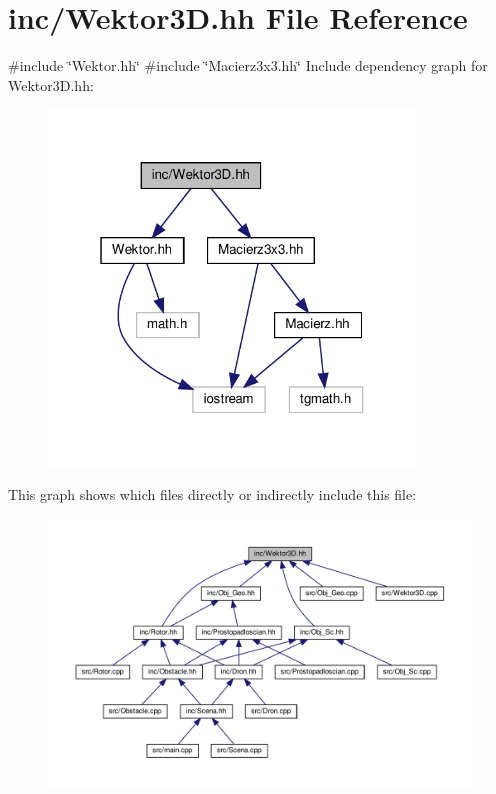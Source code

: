 \hypertarget{_wektor3_d_8hh}{}\section{inc/\+Wektor3D.hh File Reference}
\label{_wektor3_d_8hh}
{\ttfamily \#include \char`\"{}Wektor.\+hh\char`\"{}}\newline
{\ttfamily \#include \char`\"{}Macierz3x3.\+hh\char`\"{}}\newline
Include dependency graph for Wektor3\+D.\+hh\+:\nopagebreak
\begin{figure}[H]
\begin{center}
\leavevmode
\includegraphics[width=277pt]{_wektor3_d_8hh__incl}
\end{center}
\end{figure}
This graph shows which files directly or indirectly include this file\+:
\nopagebreak
\begin{figure}[H]
\begin{center}
\leavevmode
\includegraphics[width=350pt]{_wektor3_d_8hh__dep__incl}
\end{center}
\end{figure}
